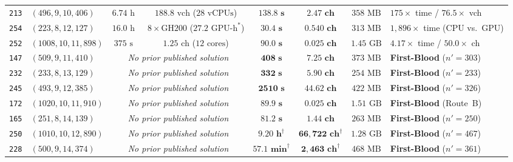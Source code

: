 \documentclass[11pt,a4paper]{article}
\theoremstyle{definition}
\theoremstyle{remark}
\begin{document}
\begin{table}[t]
{{\begin{tabular}{@{}llcccccl@{}}
\texttt{213} & $(496, 9, 10, 406)$   & $6.74\text{ h}$~\cite{Saa26a}         & $188.8\text{ vch}$ ($28\text{ vCPUs}$)  & $\mathbf{138.8\text{ s}}$ & $\mathbf{2.47\text{ ch}}$  & $358\text{ MB}$  & $175\times$ time / $76.5\times$ vch \\
\texttt{254} & $(223, 8, 12, 127)$   & $16.0\text{ h}$~\cite{Saa26b,SaaRepo} & $8{\times}\text{GH200}$ ($27.2\text{ GPU-h}^\ast$) & $\mathbf{30.4\text{ s}}$ & $\mathbf{0.540\text{ ch}}$ & $313\text{ MB}$ & $1{,}896\times$ time (CPU vs.\ GPU) \\
\texttt{252} & $(1008, 10, 11, 898)$ & $375\text{ s}$~\cite{Saa26a}          & $1.25\text{ ch}$ ($12\text{ cores}$)    & $\mathbf{90.0\text{ s}}$  & $\mathbf{0.025\text{ ch}}$ & $1.45\text{ GB}$ & $4.17\times$ time / $50.0\times$ ch \\
\midrule
\texttt{147} & $(509, 9, 11, 410)$   & \multicolumn{2}{c}{\emph{No prior published solution}}                  & $\mathbf{408\text{ s}}$   & $\mathbf{7.25\text{ ch}}$  & $373\text{ MB}$  & \textbf{First-Blood} ($n'=303$) \\
\texttt{232} & $(233, 8, 13, 129)$   & \multicolumn{2}{c}{\emph{No prior published solution}}                  & $\mathbf{332\text{ s}}$   & $\mathbf{5.90\text{ ch}}$  & $254\text{ MB}$  & \textbf{First-Blood} ($n'=233$) \\
\texttt{245} & $(493, 9, 12, 385)$   & \multicolumn{2}{c}{\emph{No prior published solution}}                  & $\mathbf{2510\text{ s}}$  & $\mathbf{44.62\text{ ch}}$ & $422\text{ MB}$  & \textbf{First-Blood} ($n'=326$) \\
\texttt{172} & $(1020, 10, 11, 910)$ & \multicolumn{2}{c}{\emph{No prior published solution}}                  & $\mathbf{89.9\text{ s}}$  & $\mathbf{0.025\text{ ch}}$ & $1.51\text{ GB}$ & \textbf{First-Blood} (Route~B) \\
\texttt{165} & $(251, 8, 14, 139)$   & \multicolumn{2}{c}{\emph{No prior published solution}}                  & $\mathbf{81.2\text{ s}}$  & $\mathbf{1.44\text{ ch}}$  & $263\text{ MB}$  & \textbf{First-Blood} ($n'=250$) \\
\texttt{250} & $(1010, 10, 12, 890)$ & \multicolumn{2}{c}{\emph{No prior published solution}}                  & $\mathbf{9.20\text{ h}}^\dagger$  & $\mathbf{66{,}722\text{ ch}}^\dagger$ & $1.28\text{ GB}$ & \textbf{First-Blood} ($n'=467$) \\
\texttt{228} & $(500, 9, 14, 374)$   & \multicolumn{2}{c}{\emph{No prior published solution}}                  & $\mathbf{57.1\text{ min}}^\dagger$ & $\mathbf{2{,}463\text{ ch}}^\dagger$  & $468\text{ MB}$  & \textbf{First-Blood} ($n'=361$) \\

\end{tabular}}}
\end{table}
\end{document}
